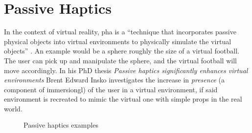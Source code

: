 \section{Passive Haptics}\label{section:passiveHaptics}

In the context of virtual reality, \gls{pha} is a \enquote{technique that incorporates passive physical objects into virtual environments to physically simulate the virtual objects} \autocite[p. ~9]{passiveHaptics}. An example would be a sphere roughly the size of a virtual football. The user can pick up and manipulate the sphere, and the virtual football will move accordingly. In his PhD thesis \textit{Passive haptics significantly enhances virtual environments} Brent Edward Insko investigates the increase in \textit{presence} (a component of \gls{immersiongl}) of the user in a virtual environment, if said environment is recreated to mimic the virtual one with simple props in the real world.
\newline

\begin{figure}[h]
    \centering
    \hfill
    \hfill
    \caption{Passive haptics examples}
    \label{fig:passiveHapticsPics}
\end{figure}

